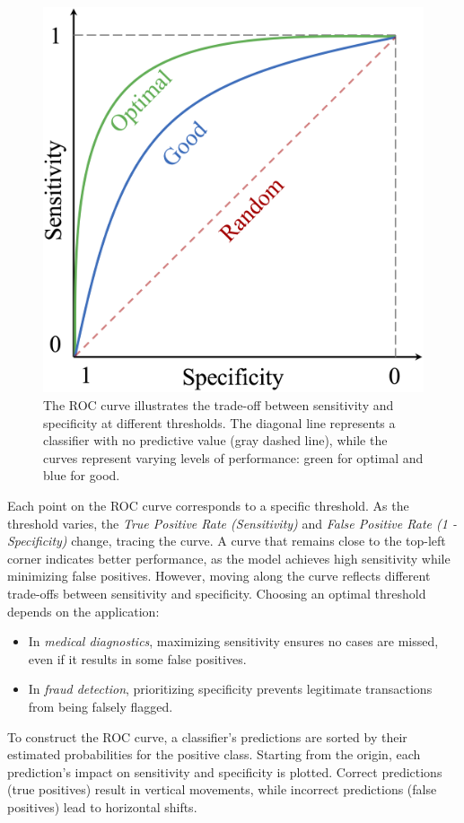 \documentclass[
  11pt,
]{book}
\providecommand{\tightlist}{%
  \setlength{\itemsep}{0pt}\setlength{\parskip}{0pt}}
\theoremstyle{definition}
\theoremstyle{definition}
\theoremstyle{definition}
\theoremstyle{definition}
\theoremstyle{remark}
\begin{document}
\begin{figure}[H]

{\centering \includegraphics[width=0.6\linewidth]{images/ch8_roc-curve} 

}

\caption{The ROC curve illustrates the trade-off between sensitivity and specificity at different thresholds. The diagonal line represents a classifier with no predictive value (gray dashed line), while the curves represent varying levels of performance: green for optimal and blue for good.}\label{fig:roc-curve}
\end{figure}

Each point on the ROC curve corresponds to a specific threshold. As the threshold varies, the \emph{True Positive Rate (Sensitivity)} and \emph{False Positive Rate (1 - Specificity)} change, tracing the curve. A curve that remains close to the top-left corner indicates better performance, as the model achieves high sensitivity while minimizing false positives. However, moving along the curve reflects different trade-offs between sensitivity and specificity. Choosing an optimal threshold depends on the application:

\begin{itemize}
\tightlist
\item
  In \emph{medical diagnostics}, maximizing sensitivity ensures no cases are missed, even if it results in some false positives.\\
\item
  In \emph{fraud detection}, prioritizing specificity prevents legitimate transactions from being falsely flagged.
\end{itemize}

To construct the ROC curve, a classifier's predictions are sorted by their estimated probabilities for the positive class. Starting from the origin, each prediction's impact on sensitivity and specificity is plotted. Correct predictions (true positives) result in vertical movements, while incorrect predictions (false positives) lead to horizontal shifts.
\end{document}
